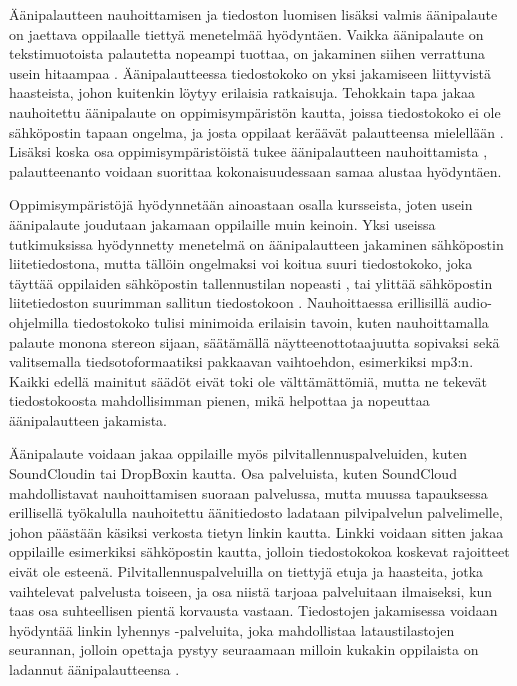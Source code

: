 \documentclass[utf8]{gradu3}
\begin{document}
Äänipalautteen nauhoittamisen ja tiedoston luomisen lisäksi valmis äänipalaute on jaettava oppilaalle tiettyä menetelmää hyödyntäen. Vaikka äänipalaute on tekstimuotoista palautetta nopeampi tuottaa, on jakaminen siihen verrattuna usein hitaampaa \parencite[][]{evaluating}. Äänipalautteessa tiedostokoko on yksi jakamiseen liittyvistä haasteista, johon kuitenkin löytyy erilaisia ratkaisuja. Tehokkain tapa jakaa nauhoitettu äänipalaute on oppimisympäristön kautta, joissa tiedostokoko ei ole sähköpostin tapaan ongelma, ja josta oppilaat keräävät palautteensa mielellään \parencite[][]{areYouListening}. Lisäksi koska osa oppimisympäristöistä tukee äänipalautteen nauhoittamista \parencite[][]{using}, palautteenanto  voidaan suorittaa kokonaisuudessaan samaa alustaa hyödyntäen. 

Oppimisympäristöjä hyödynnetään ainoastaan osalla kursseista, joten usein äänipalaute joudutaan jakamaan oppilaille muin keinoin. Yksi useissa tutkimuksissa hyödynnetty menetelmä on äänipalautteen jakaminen sähköpostin liitetiedostona, mutta tällöin ongelmaksi voi koitua suuri tiedostokoko, joka täyttää oppilaiden sähköpostin tallennustilan nopeasti \parencite[][]{developing}, tai ylittää sähköpostin liitetiedoston suurimman sallitun tiedostokoon \parencite[][]{versus}. Nauhoittaessa erillisillä audio-ohjelmilla tiedostokoko tulisi minimoida erilaisin tavoin, kuten nauhoittamalla palaute monona stereon sijaan, säätämällä näytteenottotaajuutta sopivaksi \parencite[][]{voice} sekä valitsemalla tiedsotoformaatiksi pakkaavan vaihtoehdon, esimerkiksi mp3:n. Kaikki edellä mainitut säädöt eivät toki ole välttämättömiä, mutta ne tekevät tiedostokoosta mahdollisimman pienen, mikä helpottaa ja nopeuttaa äänipalautteen jakamista. 

Äänipalaute voidaan jakaa oppilaille myös pilvitallennuspalveluiden, kuten SoundCloudin tai DropBoxin kautta. Osa palveluista, kuten SoundCloud mahdollistavat nauhoittamisen suoraan palvelussa, mutta muussa tapauksessa erillisellä työkalulla nauhoitettu äänitiedosto ladataan pilvipalvelun palvelimelle, johon päästään käsiksi verkosta tietyn linkin kautta. Linkki voidaan sitten jakaa oppilaille esimerkiksi sähköpostin kautta, jolloin tiedostokokoa koskevat rajoitteet eivät ole esteenä. Pilvitallennuspalveluilla on tiettyjä etuja ja haasteita, jotka vaihtelevat palvelusta toiseen, ja osa niistä tarjoaa palveluitaan ilmaiseksi, kun taas osa suhteellisen pientä korvausta vastaan. Tiedostojen jakamisessa voidaan hyödyntää linkin lyhennys -palveluita, joka mahdollistaa lataustilastojen seurannan, jolloin opettaja pystyy seuraamaan milloin kukakin oppilaista on ladannut äänipalautteensa \parencite[][]{engaging}.
\end{document}
